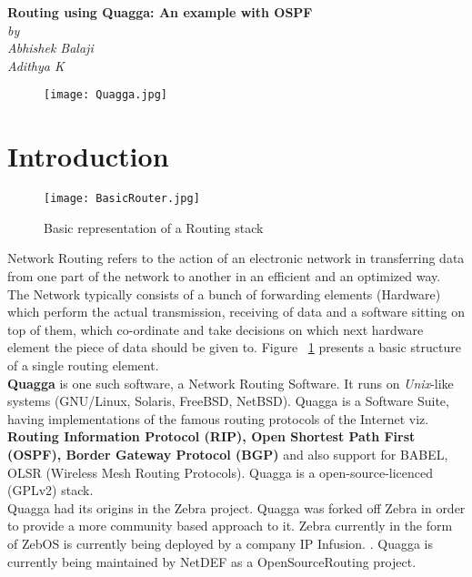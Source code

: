 \documentclass{article}
\begin{document}
\begin{titlepage}
\begin{center}
    \Large\textbf{Routing using Quagga: An example with OSPF}\\
    \textit{by}\\
    \large\textit{Abhishek Balaji \\ Adithya K}
\end{center}
\vspace{2cm}
\begin{figure}[ht!]
  \centering
  \texttt{[image: Quagga.jpg]}
\end{figure}

\end{titlepage}
\tableofcontents
\clearpage
\section{Introduction}
\begin{figure}[ht!]
  \centering
  \texttt{[image: BasicRouter.jpg]}
  \caption{Basic representation of a Routing stack}
  \label{fig:basicrouter}
\end{figure}
Network Routing refers to the action of an electronic network in transferring data 
from one part of the network to another in an efficient and an optimized way. 
The Network typically consists of a bunch of forwarding elements (Hardware) which 
perform the actual transmission, receiving of data and a software sitting on top of them, 
which co-ordinate and take decisions on which next hardware element the piece of data 
should be given to. Figure~ \ref{fig:basicrouter} presents a basic structure 
of a single routing element.\\
\textbf{Quagga} is one such software, a Network Routing Software. It runs on \textit{Unix}-like systems 
(GNU/Linux, Solaris, FreeBSD, NetBSD). Quagga is a Software Suite, having implementations 
of the famous routing protocols of the Internet viz. \textbf{Routing Information Protocol (RIP), 
Open Shortest Path First (OSPF), Border Gateway Protocol (BGP)} and also support for 
BABEL, OLSR (Wireless Mesh Routing Protocols). Quagga is a open-source-licenced (GPLv2) stack.\\
Quagga had its origins in the Zebra project. Quagga was forked off Zebra in order to provide a
more community based approach to it. Zebra currently in the form of ZebOS is currently being
deployed by a company IP Infusion. \cite{zebraipinfusion}. Quagga is currently being maintained
by NetDEF \cite{netdef} as a OpenSourceRouting project.
\end{document}
